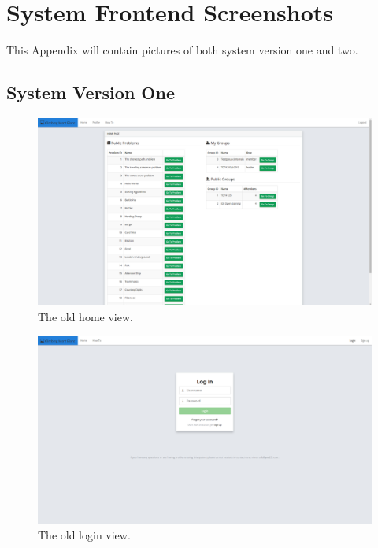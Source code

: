 \chapter{System Frontend Screenshots}
\label{apdx:screenshots}
This Appendix will contain pictures of both system version one and two.

\section{System Version One}
\begin{figure}[h!]
    \centering
    \includegraphics[width=1.0\textwidth]{oldscreenshots/frontpage.png}
    \caption[]{The old home view.}
    \label{fig:apdx-old-home}
\end{figure}

\begin{figure}[h!]
    \centering
    \includegraphics[width=1.0\textwidth]{oldscreenshots/login.png}
    \caption[]{The old login view.}
    \label{fig:apdx-old-login}
\end{figure}

